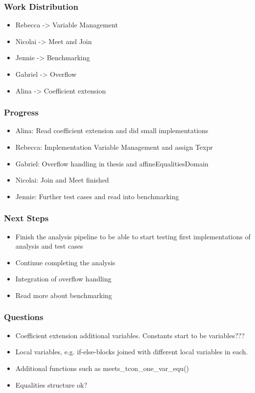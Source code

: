 \documentclass[english,xcolor=table]{i20lecture}
\subtitle{Relational Domains}
\begin{document}

\frame{\titlepage}



\begin{frame}
	\frametitle{Work Distribution}
	\begin{itemize}
		\item Rebecca -> Variable Management
		\item Nicolai -> Meet and Join
		\item Jennie -> Benchmarking
		\item Gabriel -> Overflow
		\item Alina -> Coefficient extension
	\end{itemize}
\end{frame}

\begin{frame}
	\frametitle{Progress}
		\begin{itemize}
			\item Alina: Read coefficient extension and did small implementations
			\item Rebecca: Implementation Variable Management and assign Texpr
			\item Gabriel: Overflow handling in thesis and affineEqualitiesDomain
			\item Nicolai: Join and Meet finished 
			\item Jennie: Further test cases and read into benchmarking
		\end{itemize}
\end{frame}

\begin{frame}
	\frametitle{Next Steps}
	\begin{itemize}
		\item Finish the analysis pipeline to be able to start testing first implementations of analysis and test cases
		\item Continue completing the analysis
		\item Integration of overflow handling
		\item Read more about benchmarking
	\end{itemize}
\end{frame}

\begin{frame}
	\frametitle{Questions}
	\begin{itemize}
		\item Coefficient extension additional variables. Constants start to be variables???
		\item Local variables, e.g. if-else-blocks joined with different local variables in each.
		\item Additional functions such as meets\_tcon\_one\_var\_equ()
		\item Equalities structure ok?
	\end{itemize}
\end{frame}

	
\end{document}

